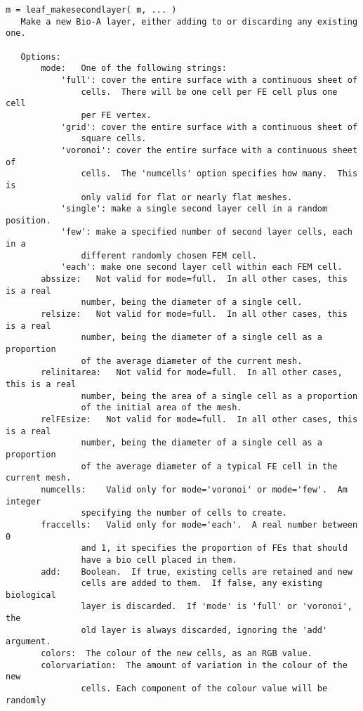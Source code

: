 \begin{verbatim}
m = leaf_makesecondlayer( m, ... )
   Make a new Bio-A layer, either adding to or discarding any existing one.

   Options:
       mode:   One of the following strings:
           'full': cover the entire surface with a continuous sheet of
               cells.  There will be one cell per FE cell plus one cell
               per FE vertex.
           'grid': cover the entire surface with a continuous sheet of
               square cells.
           'voronoi': cover the entire surface with a continuous sheet of
               cells.  The 'numcells' option specifies how many.  This is
               only valid for flat or nearly flat meshes.
           'single': make a single second layer cell in a random position.
           'few': make a specified number of second layer cells, each in a
               different randomly chosen FEM cell.
           'each': make one second layer cell within each FEM cell.
       abssize:   Not valid for mode=full.  In all other cases, this is a real
               number, being the diameter of a single cell.
       relsize:   Not valid for mode=full.  In all other cases, this is a real
               number, being the diameter of a single cell as a proportion
               of the average diameter of the current mesh.
       relinitarea:   Not valid for mode=full.  In all other cases, this is a real
               number, being the area of a single cell as a proportion
               of the initial area of the mesh.
       relFEsize:   Not valid for mode=full.  In all other cases, this is a real
               number, being the diameter of a single cell as a proportion
               of the average diameter of a typical FE cell in the current mesh.
       numcells:    Valid only for mode='voronoi' or mode='few'.  Am integer
               specifying the number of cells to create.
       fraccells:   Valid only for mode='each'.  A real number between 0
               and 1, it specifies the proportion of FEs that should
               have a bio cell placed in them.
       add:    Boolean.  If true, existing cells are retained and new
               cells are added to them.  If false, any existing biological
               layer is discarded.  If 'mode' is 'full' or 'voronoi', the
               old layer is always discarded, ignoring the 'add' argument.
       colors:  The colour of the new cells, as an RGB value.
       colorvariation:  The amount of variation in the colour of the new
               cells. Each component of the colour value will be randomly

\end{verbatim}
